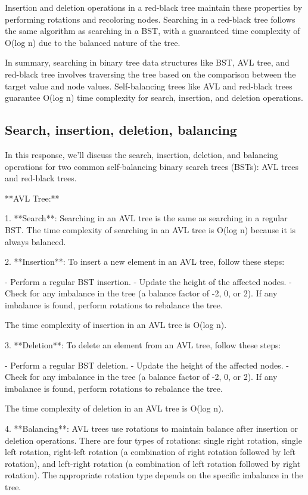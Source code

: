 \documentclass{article}
\begin{document}
   Insertion and deletion operations in a red-black tree maintain these properties by performing rotations and recoloring nodes. Searching in a red-black tree follows the same algorithm as searching in a BST, with a guaranteed time complexity of O(log n) due to the balanced nature of the tree.

In summary, searching in binary tree data structures like BST, AVL tree, and red-black tree involves traversing the tree based on the comparison between the target value and node values. Self-balancing trees like AVL and red-black trees guarantee O(log n) time complexity for search, insertion, and deletion operations.


\subsection{Search, insertion, deletion, balancing}

In this response, we'll discuss the search, insertion, deletion, and balancing operations for two common self-balancing binary search trees (BSTs): AVL trees and red-black trees.

**AVL Tree:**

1. **Search**: Searching in an AVL tree is the same as searching in a regular BST. The time complexity of searching in an AVL tree is O(log n) because it is always balanced.

2. **Insertion**: To insert a new element in an AVL tree, follow these steps:

   - Perform a regular BST insertion.
   - Update the height of the affected nodes.
   - Check for any imbalance in the tree (a balance factor of -2, 0, or 2). If any imbalance is found, perform rotations to rebalance the tree.

   The time complexity of insertion in an AVL tree is O(log n).

3. **Deletion**: To delete an element from an AVL tree, follow these steps:

   - Perform a regular BST deletion.
   - Update the height of the affected nodes.
   - Check for any imbalance in the tree (a balance factor of -2, 0, or 2). If any imbalance is found, perform rotations to rebalance the tree.

   The time complexity of deletion in an AVL tree is O(log n).

4. **Balancing**: AVL trees use rotations to maintain balance after insertion or deletion operations. There are four types of rotations: single right rotation, single left rotation, right-left rotation (a combination of right rotation followed by left rotation), and left-right rotation (a combination of left rotation followed by right rotation). The appropriate rotation type depends on the specific imbalance in the tree.
\end{document}
